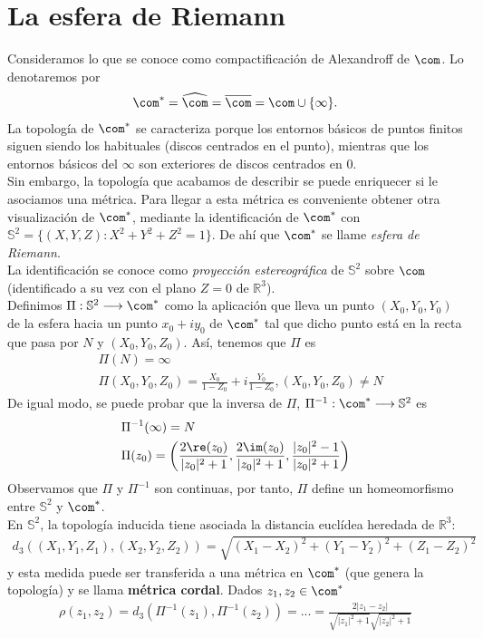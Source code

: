 \section{La esfera de Riemann}
Consideramos lo que se conoce como compactificación de Alexandroff de $\com$. Lo denotaremos por
\begin{align*}
    \com^* = \widehat{\com} = \overline{\com} = \com \cup \{\infty\}.
\end{align*}
La topología de $\com^*$ se caracteriza porque los entornos básicos de puntos finitos siguen siendo los habituales (discos centrados en el punto), mientras que los entornos básicos del $\infty$ son exteriores de discos centrados en $0$.
\\
\newline
Sin embargo, la topología que acabamos de describir se puede enriquecer si le asociamos una métrica. Para llegar a esta métrica es conveniente obtener otra visualización de $\com^*$, mediante la identificación de $\com^*$ con $\mathbb{S}^2 = \{(X,Y,Z) : X^2 + Y^2 + Z^2 = 1\}$. De ahí que $\com^*$ se llame \textit{esfera de Riemann}.
\\
\newline
La identificación se conoce como \textit{proyección estereográfica} de $\mathbb{S}^2$ sobre $\com$ (identificado a su vez con el plano $Z = 0$ de $\mathbb{R}^3$).
\\
\newline
Definimos $\Pi : \mathbb{S}^2 \longrightarrow \com^*$ como la aplicación que lleva un punto $(X_0,Y_0,Y_0)$ de la esfera hacia un punto $x_0 + iy_0$ de $\com^*$ tal que dicho punto está en la recta que pasa por $N$ y $(X_0,Y_0,Z_0)$. Así, tenemos que $\Pi$ es
\begin{align*}
    &\Pi(N) = \infty \\
    &\Pi(X_0,Y_0,Z_0) = \frac{X_0}{1-Z_0} + i\frac{Y_0}{1 - Z_0}, (X_0,Y_0,Z_0) \not = N
\end{align*}
De igual modo, se puede probar que la inversa de $\Pi$, $\Pi^{-1} : \com^* \longrightarrow \mathbb{S}^2$ es
\begin{align*}
    &\Pi^{-1}(\infty) = N\\
    &\Pi(z_0) = \left( \frac{2\re(z_0)}{|z_0|^2 + 1}, \frac{2\im(z_0)}{|z_0|^2 + 1}, \frac{|z_0|^2 - 1}{|z_0|^2 + 1}\right)
\end{align*}
Observamos que $\Pi$ y $\Pi^{-1}$ son continuas, por tanto, $\Pi$ define un homeomorfismo entre $\mathbb{S}^2$ y $\com^*$.
\\
\newline
En $\mathbb{S}^2$, la topología inducida tiene asociada la distancia euclídea heredada de $\mathbb{R}^3$:
\begin{align*}
    d_3((X_1,Y_1,Z_1),(X_2,Y_2,Z_2)) = \sqrt{(X_1 - X_2)^2 + (Y_1 - Y_2)^2 + (Z_1 - Z_2)^2}
\end{align*}
y esta medida puede ser transferida a una métrica en $\com^*$ (que genera la topología) y se llama \textbf{métrica cordal}. Dados $z_1,z_2 \in \com^*$
\begin{align*}
    \rho(z_1,z_2) = d_3\left( \Pi^{-1}(z_1), \Pi^{-1}(z_2)\right) = ... = \frac{2|z_1 - z_2|}{\sqrt{|z_1|^2+1}\sqrt{|z_2|^2+1}}
\end{align*}

